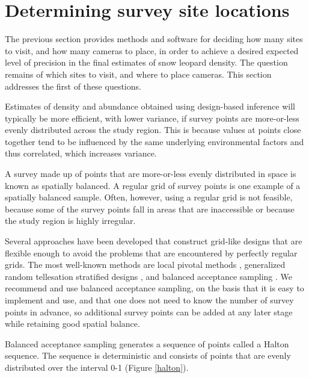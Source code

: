 \documentclass[a4paper,11pt]{article} %
\begin{document}
\section{Determining survey site locations} \label{s:halton}

The previous section provides methods and software for deciding how many sites to visit, and how many cameras to place, in order to achieve a desired expected level of precision in the final estimates of snow leopard density. The question remains of which sites to visit, and where to place cameras. This section addresses the first of these questions.

Estimates of density and abundance obtained using design-based inference will typically be more efficient, with lower variance, if survey points are more-or-less evenly distributed across the study region. This is because values at points close together tend to be influenced by the same underlying environmental factors and thus correlated, which increases variance. 

A survey made up of points that are more-or-less evenly distributed in space is known as spatially balanced. A regular grid of survey points is one example of a spatially balanced sample. Often, however, using a regular grid is not feasible, because some of the survey points fall in areas that are inaccessible or because the study region is highly irregular. 

Several approaches have been developed that construct grid-like designs that are flexible enough to avoid the problems that are encountered by perfectly regular grids. The most well-known methods are local pivotal methods \citep{Grafstrom2012}, generalized random tellesation stratified designs \citep{Stevens2004}, and balanced acceptance sampling \citep{Robertson2013,Vandambates2018}. We recommend and use balanced acceptance sampling, on the basis that it is easy to implement and use, and that one does not need to know the number of survey points in advance, so additional survey points can be added at any later stage while retaining good spatial balance.

Balanced acceptance sampling generates a sequence of points called a Halton sequence. The sequence is deterministic and consists of points that are evenly distributed over the interval 0-1 (Figure \ref{halton}). 
\end{document}
